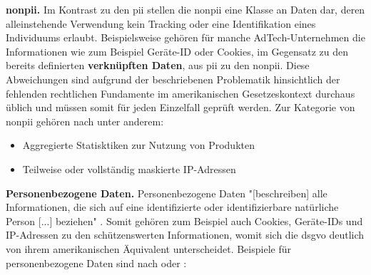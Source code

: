 
\noindent \textbf{\acf{nonpii}.}
Im Kontrast zu den \ac{pii} stellen die \ac{nonpii} eine Klasse an Daten dar, deren alleinstehende Verwendung kein Tracking oder eine Identifikation eines Individuums erlaubt. Beispielsweise gehören für manche AdTech-Unternehmen die Informationen wie zum Beispiel Geräte-ID oder Cookies, im Gegensatz zu den bereits definierten \textbf{verknüpften Daten}, aus \ac{pii} zu den \ac{nonpii}. Diese Abweichungen sind aufgrund der beschriebenen Problematik hinsichtlich der fehlenden rechtlichen Fundamente im amerikanischen Gesetzeskontext durchaus üblich und müssen somit für jeden Einzelfall geprüft werden. Zur Kategorie von \ac{nonpii} gehören nach \cite{PiwikPro2022} unter anderem:

\begin{itemize}
	\item Aggregierte Statisktiken zur Nutzung von Produkten
	\item Teilweise oder vollständig maskierte IP-Adressen
\end{itemize} 


\noindent \textbf{Personenbezogene Daten.}
Personenbezogene Daten "[beschreiben] alle Informationen, die sich auf eine identifizierte oder identifizierbare natürliche Person [...] beziehen" \cite{DSGVOArt4}. Somit gehören zum Beispiel auch Cookies, Geräte-IDs und IP-Adressen zu den schützenswerten Informationen, womit sich die \ac{dsgvo} deutlich von ihrem amerikanischen Äquivalent unterscheidet. Beispiele für personenbezogene Daten sind nach \cite{PiwikPro2022} oder \cite{DSGVOPerDa}:

